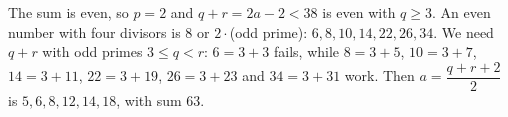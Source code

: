 The sum is even, so $p=2$ and $q+r=2a-2<38$ is even with $q\ge3$. An even number with four divisors is $8$ or $2\cdot$(odd prime): $6,8,10,14,22,26,34$. We need $q+r$ with odd primes $3\le q<r$: $6=3+3$ fails, while $8=3+5$, $10=3+7$, $14=3+11$, $22=3+19$, $26=3+23$ and $34=3+31$ work. Then $a=\dfrac{q+r+2}2$ is $5,6,8,12,14,18$, with sum $\boxed{63}$.
